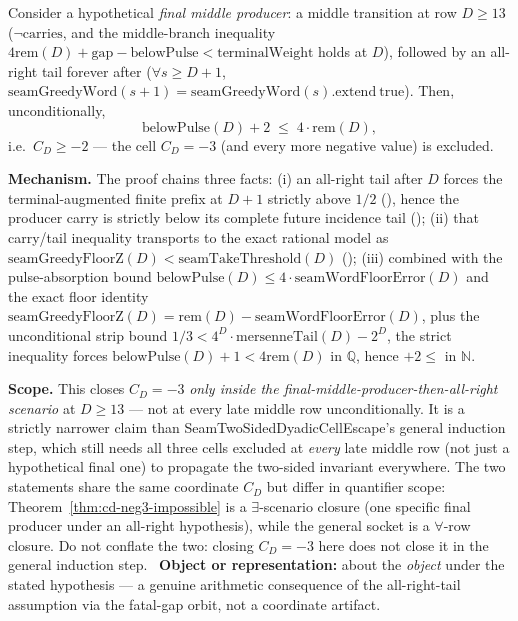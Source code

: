 \begin{thm}[$C_D=-3$ is impossible at the final middle producer, $D\ge 13$]
\label{thm:cd-neg3-impossible}
Consider a hypothetical \emph{final middle producer}: a middle transition at row $D\ge 13$
($\lnot\mathrm{carries}$, and the middle-branch inequality
$4\mathrm{rem}(D)+\mathrm{gap}-\mathrm{belowPulse} < \mathrm{terminalWeight}$ holds at $D$), followed
by an all-right tail forever after ($\forall s\ge D{+}1$, $\mathrm{seamGreedyWord}(s+1) =
\mathrm{seamGreedyWord}(s).\mathrm{extend}\ \mathrm{true}$). Then, unconditionally,
\[
  \mathrm{belowPulse}(D) + 2 \;\le\; 4\cdot\mathrm{rem}(D),
\]
i.e.\ $C_D \ge -2$ — the cell $C_D=-3$ (and every more negative value) is excluded.

\textbf{Mechanism.} The proof chains three facts: (i) an all-right tail after $D$ forces the
terminal-augmented finite prefix at $D{+}1$ strictly above $1/2$
(),
hence the producer carry is strictly below its complete future incidence tail
();
(ii) that carry/tail inequality transports to the exact rational model as
$\mathrm{seamGreedyFloorZ}(D) < \mathrm{seamTakeThreshold}(D)$
();
(iii) combined with the pulse-absorption bound
$\mathrm{belowPulse}(D)\le 4\cdot\mathrm{seamWordFloorError}(D)$ and the exact floor identity
$\mathrm{seamGreedyFloorZ}(D)=\mathrm{rem}(D)-\mathrm{seamWordFloorError}(D)$, plus the unconditional strip
bound $1/3 < 4^D\cdot\mathrm{mersenneTail}(D)-2^D$, the strict inequality forces
$\mathrm{belowPulse}(D)+1 < 4\mathrm{rem}(D)$ in $\mathbb{Q}$, hence $+2\le$ in $\mathbb{N}$.

\textbf{Scope.} This closes $C_D=-3$ \emph{only inside the final-middle-producer-then-all-right
scenario} at $D\ge 13$ — not at every late middle row unconditionally. It is a strictly narrower
claim than \textsf{SeamTwoSidedDyadicCellEscape}'s general induction step, which still needs all
three cells excluded at \emph{every} late middle row (not just a hypothetical final one) to
propagate the two-sided invariant everywhere. The two statements share the same coordinate $C_D$
but differ in quantifier scope: Theorem~\ref{thm:cd-neg3-impossible} is a $\exists$-scenario
closure (one specific final producer under an all-right hypothesis), while the general socket is a
$\forall$-row closure. Do not conflate the two: closing $C_D=-3$ here does not close it in the
general induction step.
\ \textbf{Object or representation:} about the \emph{object}
under the stated hypothesis — a genuine arithmetic consequence of the all-right-tail assumption
via the fatal-gap orbit, not a coordinate artifact. 
\end{thm}

